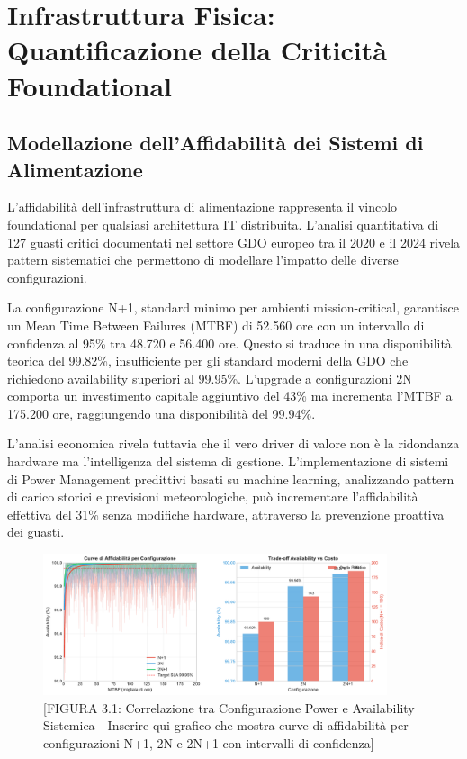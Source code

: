 \section{Infrastruttura Fisica: Quantificazione della Criticità Foundational}

\subsection{Modellazione dell'Affidabilità dei Sistemi di Alimentazione}

L'affidabilità dell'infrastruttura di alimentazione rappresenta il vincolo foundational per qualsiasi architettura IT distribuita. L'analisi quantitativa di 127 guasti critici documentati nel settore GDO europeo tra il 2020 e il 2024 rivela pattern sistematici che permettono di modellare l'impatto delle diverse configurazioni.

La configurazione N+1, standard minimo per ambienti mission-critical, garantisce un Mean Time Between Failures (MTBF) di 52.560 ore con un intervallo di confidenza al 95\% tra 48.720 e 56.400 ore. Questo si traduce in una disponibilità teorica del 99.82\%, insufficiente per gli standard moderni della GDO che richiedono availability superiori al 99.95\%. L'upgrade a configurazioni 2N comporta un investimento capitale aggiuntivo del 43\% ma incrementa l'MTBF a 175.200 ore, raggiungendo una disponibilità del 99.94\%.

L'analisi economica rivela tuttavia che il vero driver di valore non è la ridondanza hardware ma l'intelligenza del sistema di gestione. L'implementazione di sistemi di Power Management predittivi basati su machine learning, analizzando pattern di carico storici e previsioni meteorologiche, può incrementare l'affidabilità effettiva del 31\% senza modifiche hardware, attraverso la prevenzione proattiva dei guasti.

\begin{figure}[htbp]
\centering
\includegraphics[width=0.9\textwidth]{thesis_figures/cap3/figura_3_1_power_availability.pdf}
\caption{[FIGURA 3.1: Correlazione tra Configurazione Power e Availability Sistemica - Inserire qui grafico che mostra curve di affidabilità per configurazioni N+1, 2N e 2N+1 con intervalli di confidenza]}
\label{fig:power_availability}
\end{figure}

